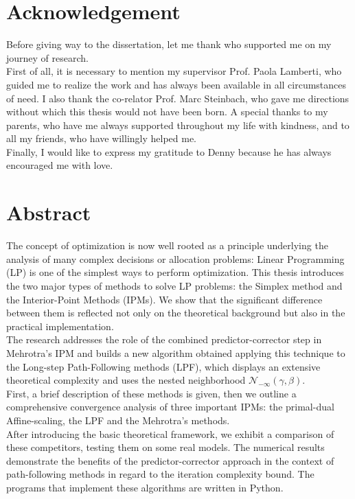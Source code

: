 \documentclass[a4paper,10 pt,titlepage,twoside]{report}
\theoremstyle{plain}
\theoremstyle{definition}
\theoremstyle{remark}
\begin{document}
\chapter*{Acknowledgement}
Before giving way to the dissertation, let me thank who supported me on my journey
of research.\\
First of all, it is necessary to mention my supervisor Prof. Paola Lamberti,
who guided me to realize the work and has always been available in all circumstances of
need. I also thank the co-relator Prof. Marc Steinbach, who gave me directions without
which this thesis would not have been born. A special thanks to my parents, who have me
always supported throughout my life with kindness, and to all my friends, who have willingly helped me.\\
Finally, I would like to express my gratitude to Denny because he has always encouraged me with love.
\tableofcontents

% 
%
\chapter*{Abstract}
The concept of optimization is now well rooted as a principle underlying the analysis
of many complex decisions or allocation problems: Linear Programming (LP) is one of the simplest ways to perform optimization.
This thesis introduces the two major types of methods to solve LP problems: the Simplex method and the Interior-Point Methods (IPMs).
We show that the significant difference between them is reflected not only on the theoretical background but also in the practical implementation.\\
The research addresses the role of the combined predictor-corrector step in Mehrotra's IPM and builds a new algorithm obtained applying this technique to the Long-step Path-Following methods (LPF), which displays an extensive theoretical complexity and uses the nested neighborhood $\mathcal{N}_{-\infty}(\gamma,\beta)$.\\
First, a brief description of these methods is given,
then we outline a comprehensive convergence analysis of three important IPMs: the primal-dual Affine-scaling, the LPF and the Mehrotra's methods. \\
After introducing the basic theoretical framework, we exhibit a comparison of these competitors, testing them on some real models. The numerical
results demonstrate the benefits of the predictor-corrector approach in the context of path-following methods in regard to the iteration complexity bound.
The programs that implement these algorithms are written in Python. 
\end{document}
